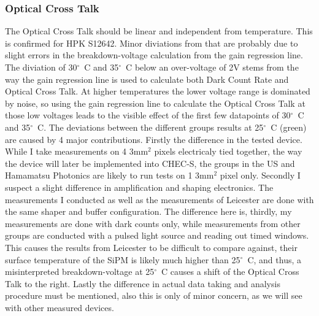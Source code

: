 \documentclass[12pt,article,type=msc,colorback,accentcolor=tud9c]{tudthesis}
\begin{document}
\begin{figure}[h]
\begin{centering}
\caption{}
\label{fig:}
\end{centering}
\end{figure}




\subsubsection{Optical Cross Talk}
The Optical Cross Talk should be linear and independent from temperature. This is confirmed for HPK S12642. Minor diviations from that are probably due to slight errors in the breakdown-voltage calculation from the gain regression line. The diviation of 30${^\circ}$~C and 35${^\circ}$~C below an over-voltage of 2V stems from the way the gain regression line is used to calculate both Dark Count Rate and Optical Cross Talk. At higher temperatures the lower voltage range is dominated by noise, so using the gain regression line to calculate the Optical Cross Talk at those low voltages leads to the visible effect of the first few datapoints of 30${^\circ}$~C and 35${^\circ}$~C. 
The deviations between the different groups results at 25${^\circ}$~C (green) are caused by 4 major contributions. Firstly the difference in the tested device. While I take measurements on 4 3mm$^2$ pixels electricaly tied together, the way the device will later be implemented into CHEC-S, the groups in the US and Hamamatsu Photonics are likely to run tests on 1 3mm$^2$ pixel only. Secondly I suspect a slight difference in amplification and shaping electronics. The measurements I conducted as well as the measurements of Leicester are done with the same shaper and buffer configuration. The difference here is, thirdly, my measurements are done with dark counts only, while measurements from other groups are conducted with a pulsed light source and reading out timed windows. This causes the results from Leicester to be difficult to compare against, their surface temperature of the SiPM is likely much higher than 25${^\circ}$~C, and thus, a misinterpreted breakdown-voltage at 25${^\circ}$~C causes a shift of the Optical Cross Talk to the right. Lastly the difference in actual data taking and analysis procedure must be mentioned, also this is only of minor concern, as we will see with other measured devices.
\end{document}
